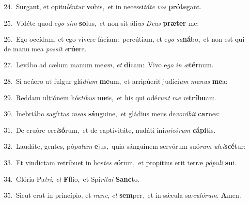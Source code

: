 {\numbfont\textcolor{\numbcolor}{24.}}~Surgant, et opitu\-\textit{lén}\-\textit{tur} \textbf{vo}\-bis,~\star et in necessi\-\textit{tá}\-\textit{te} \textit{vos} \textbf{pró}\-\textbf{te}gant.\par
{\numbfont\textcolor{\numbcolor}{25.}}~Vidéte quod e\textit{go} \textit{sim} \textbf{so}\-lus,~\star et non sit áli\textit{us} \textit{De}\-\textit{us} \textbf{præ}\-\textbf{ter} me:\par
{\numbfont\textcolor{\numbcolor}{26.}}~Ego occídam, et ego vívere fáciam:~\dagger percútiam, et e\textit{go} \textit{sa}\-\textbf{ná}bo,~\star et non est qui de manu mea \textit{pos}\-\textit{sit} \textit{e}\-\textbf{rú}\textbf{e}re.\par
{\numbfont\textcolor{\numbcolor}{27.}}~Levábo ad cælum manum me\-\textit{am}\-, \textit{et} \textbf{di}\-cam:~\star Vivo e\textit{go} \textit{in} \textit{æ}\-\textbf{tér}num.\par
{\numbfont\textcolor{\numbcolor}{28.}}~Si acúero ut fulgur glá\-\textit{di}\-\textit{um} \textbf{me}\-um,~\star et arripúerit judíci\textit{um} \textit{ma}\-\textit{nus} \textbf{me}\-a:\par
{\numbfont\textcolor{\numbcolor}{29.}}~Reddam ultiónem hós\-\textit{ti}\-\textit{bus} \textbf{me}\-is,~\star et his qui odé\textit{runt} \textit{me} \textit{re}\-\textbf{trí}\textbf{bu}am.\par
{\numbfont\textcolor{\numbcolor}{30.}}~Inebriábo sagíttas \textit{me}\-\textit{as} \textbf{sán}\-guine,~\star et gládius meus de\-\textit{vo}\-\textit{rá}\textit{bit} \textbf{car}\-nes:\par
{\numbfont\textcolor{\numbcolor}{31.}}~De cruóre \textit{oc}\-\textit{ci}\textbf{só}rum,~\star et de captivitáte, nudáti ini\-\textit{mi}\-\textit{có}\textit{rum} \textbf{cá}\-\textbf{pi}tis.\par
{\numbfont\textcolor{\numbcolor}{32.}}~Laudáte, gentes, pó\-\textit{pu}\-\textit{lum} \textbf{e}\-jus,~\star quia sánguinem servórum suó\textit{rum} \textit{ul}\-\textit{ci}\textbf{scé}tur:\par
{\numbfont\textcolor{\numbcolor}{33.}}~Et vindíctam retríbuet in hos\textit{tes} \textit{e}\-\textbf{ó}rum,~\star et propítius erit terræ \textit{pó}\-\textit{pu}\textit{li} \textbf{su}\-i.\par
{\numbfont\textcolor{\numbcolor}{34.}}~Glória Pa\-\textit{tri}\-, \textit{et} \textbf{Fí}\-lio,~\star et Spi\-\textit{rí}\-\textit{tu}\textit{i} \textbf{Sanc}\-to.\par
{\numbfont\textcolor{\numbcolor}{35.}}~Sicut erat in princípio, et \textit{nunc}\-, \textit{et} \textbf{sem}\-per,~\star et in sǽcula sæ\-\textit{cu}\-\textit{ló}\textit{rum}. \textbf{A}\-men.\par
